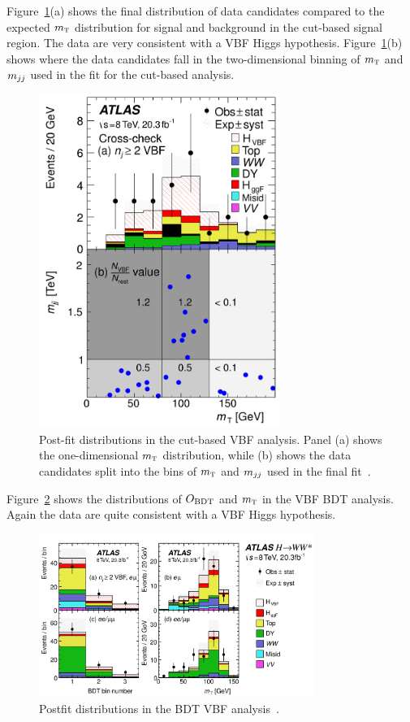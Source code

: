 Figure~\ref{fig:vbf_cb_mt}(a) shows the final distribution of data candidates compared to the expected $m_{\textrm{\footnotesize\sc t}}$ distribution for signal and background in the cut-based signal region. The data are very consistent with a VBF Higgs hypothesis. Figure~\ref{fig:vbf_cb_mt}(b) shows where the data candidates fall in the two-dimensional binning of $m_{\textrm{\footnotesize\sc t}}$ and $m_{jj}$ used in the fit for the cut-based analysis. 
%
\begin{figure}[h!]
  \centering
  \captionsetup{justification=centering}
  \includegraphics[width=0.7\textwidth]{figures/VBF_cb_mt}
  \caption{Post-fit distributions in the cut-based VBF analysis. Panel (a) shows the one-dimensional $m_{\textrm{\footnotesize\sc t}}$ distribution, while (b) shows the data candidates split into the bins of $m_{\textrm{\footnotesize\sc t}}$ and $m_{jj}$ used in the final fit~\cite{WW2015}.}
  \label{fig:vbf_cb_mt}
\end{figure}
%
Figure~\ref{fig:vbf_bdt_mt} shows the distributions of $O_{\rm BDT}$ and $m_{\textrm{\footnotesize\sc t}}$ in the VBF BDT analysis. Again the data are quite consistent with a VBF Higgs hypothesis. 
%
\begin{figure}[h!]
  \centering
  \captionsetup{justification=centering}
  \includegraphics[width=0.8\textwidth]{figures/VBF_bdt_mt}
  \caption{Postfit distributions in the BDT VBF analysis~\cite{WW2015}.}
  \label{fig:vbf_bdt_mt}
\end{figure}

